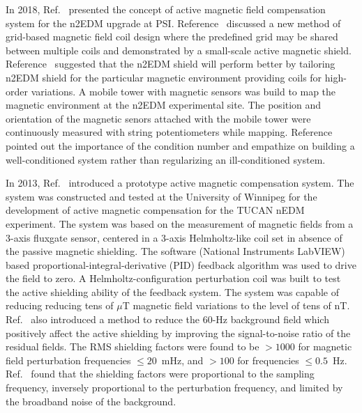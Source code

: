 In 2018, Ref.~\cite{rawlik} presented the concept of active magnetic field compensation system for the n2EDM upgrade at PSI. Reference~\cite{rawlik} discussed a new method of grid-based magnetic field coil design where the predefined grid may be shared between multiple coils and demonstrated by a small-scale active magnetic shield.   Reference~\cite{rawlik} suggested that the n2EDM shield will perform better by tailoring  n2EDM shield for the particular magnetic environment providing coils for high-order variations. A mobile tower with magnetic sensors was build to map the magnetic environment at the n2EDM experimental site. The position and orientation of the magnetic senors attached with the mobile tower were continuously measured with string potentiometers while mapping. Reference~\cite{rawlik} pointed out the importance of the condition number and empathize on building a well-conditioned system rather than regularizing an ill-conditioned system.



In 2013, Ref.~\cite{mike} introduced a prototype active magnetic compensation system. The system was constructed and tested at the University of Winnipeg for the development of active magnetic compensation for the TUCAN nEDM experiment. The system was based on the measurement of magnetic fields from a 3-axis fluxgate sensor, centered in a 3-axis Helmholtz-like coil set in absence of the passive magnetic shielding. The software (National Instruments LabVIEW) based proportional-integral-derivative (PID) feedback algorithm was used to drive the field to zero. A Helmholtz-configuration perturbation coil was built to test the active shielding ability of the feedback system. The system was capable of reducing reducing tens of $\mu$T magnetic field variations to the level of tens of nT. Ref.~\cite{mike} also introduced a method to reduce the 60-Hz background field which positively affect the active shielding by improving the signal-to-noise ratio of the residual fields. The RMS shielding factors were found to be $>1000$ for magnetic field perturbation frequencies $\leq20$~mHz, and $>100$ for frequencies $\leq0.5$~Hz.  Ref.~\cite{mike} found that the shielding factors were proportional to the sampling frequency, inversely proportional to the perturbation frequency, and limited by the broadband noise of the background.



